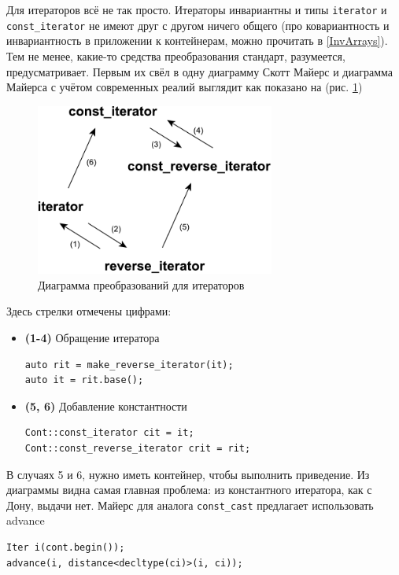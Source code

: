 \documentclass[a4paper,12pt,oneside]{book}
\begin{document}
Для итераторов всё не так просто. Итераторы инвариантны и типы \lstinline!iterator! и \lstinline!const_iterator! не имеют друг с другом ничего общего (про ковариантность и инвариантность в приложении к контейнерам, можно прочитать в \ref{InvArrays}). Тем не менее, какие-то средства преобразования стандарт, разумеется, предусматривает. Первым их свёл в одну диаграмму Скотт Майерс \cite{effectivestl} и диаграмма Майерса с учётом современных реалий выглядит как показано на (рис. \ref{fig:itersdiag})

\begin{figure}[ht]
\centering
\includegraphics[width=0.7\textwidth]{illustrations/itersdiag-crop.pdf}
\caption{Диаграмма преобразований для итераторов}
\label{fig:itersdiag}
\end{figure}

Здесь стрелки отмечены цифрами:

\begin{itemize}
\item \textbf{(1-4)} Обращение итератора
\begin{lstlisting}
auto rit = make_reverse_iterator(it);
auto it = rit.base();
\end{lstlisting}
\item \textbf{(5, 6)} Добавление константности
\begin{lstlisting}
Cont::const_iterator cit = it;
Cont::const_reverse_iterator crit = rit;
\end{lstlisting}
\end{itemize}

В случаях 5 и 6, нужно иметь контейнер, чтобы выполнить приведение. Из диаграммы видна самая главная проблема: из константного итератора, как с Дону, выдачи нет. Майерс \cite{effectivestl} для аналога \lstinline!const_cast! предлагает использовать advance

\begin{lstlisting}
Iter i(cont.begin());
advance(i, distance<decltype(ci)>(i, ci));
\end{lstlisting}
\end{document}
